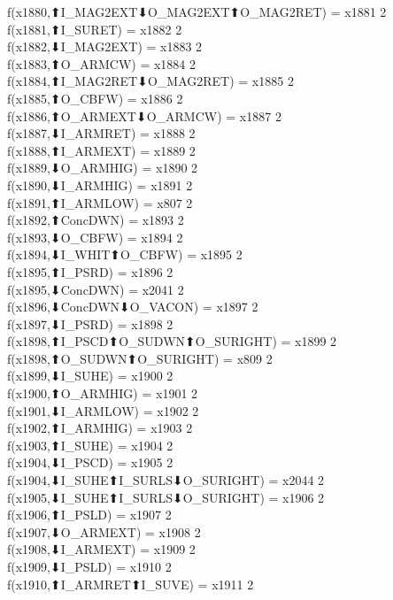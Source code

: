 f(x1880,⬆I_MAG2EXT⬇O_MAG2EXT⬆O_MAG2RET) = x1881 {2} \\
f(x1881,⬆I_SURET) = x1882 {2} \\
f(x1882,⬇I_MAG2EXT) = x1883 {2} \\
f(x1883,⬆O_ARMCW) = x1884 {2} \\
f(x1884,⬆I_MAG2RET⬇O_MAG2RET) = x1885 {2} \\
f(x1885,⬆O_CBFW) = x1886 {2} \\
f(x1886,⬆O_ARMEXT⬇O_ARMCW) = x1887 {2} \\
f(x1887,⬇I_ARMRET) = x1888 {2} \\
f(x1888,⬆I_ARMEXT) = x1889 {2} \\
f(x1889,⬇O_ARMHIG) = x1890 {2} \\
f(x1890,⬇I_ARMHIG) = x1891 {2} \\
f(x1891,⬆I_ARMLOW) = x807 {2} \\
f(x1892,⬆ConcDWN) = x1893 {2} \\
f(x1893,⬇O_CBFW) = x1894 {2} \\
f(x1894,⬇I_WHIT⬆O_CBFW) = x1895 {2} \\
f(x1895,⬆I_PSRD) = x1896 {2} \\
f(x1895,⬇ConcDWN) = x2041 {2} \\
f(x1896,⬇ConcDWN⬇O_VACON) = x1897 {2} \\
f(x1897,⬇I_PSRD) = x1898 {2} \\
f(x1898,⬆I_PSCD⬆O_SUDWN⬆O_SURIGHT) = x1899 {2} \\
f(x1898,⬆O_SUDWN⬆O_SURIGHT) = x809 {2} \\
f(x1899,⬇I_SUHE) = x1900 {2} \\
f(x1900,⬆O_ARMHIG) = x1901 {2} \\
f(x1901,⬇I_ARMLOW) = x1902 {2} \\
f(x1902,⬆I_ARMHIG) = x1903 {2} \\
f(x1903,⬆I_SUHE) = x1904 {2} \\
f(x1904,⬇I_PSCD) = x1905 {2} \\
f(x1904,⬇I_SUHE⬆I_SURLS⬇O_SURIGHT) = x2044 {2} \\
f(x1905,⬇I_SUHE⬆I_SURLS⬇O_SURIGHT) = x1906 {2} \\
f(x1906,⬆I_PSLD) = x1907 {2} \\
f(x1907,⬇O_ARMEXT) = x1908 {2} \\
f(x1908,⬇I_ARMEXT) = x1909 {2} \\
f(x1909,⬇I_PSLD) = x1910 {2} \\
f(x1910,⬆I_ARMRET⬆I_SUVE) = x1911 {2} \\
